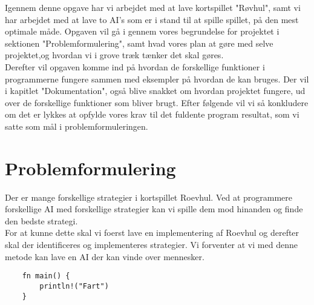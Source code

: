 \documentclass[a4paper, 12pt]{article}
\begin{document}
Igennem denne opgave har vi arbejdet med at lave kortspillet "Røvhul", samt vi har arbejdet med at lave to AI's som er i stand til at spille spillet, på den mest optimale måde. Opgaven vil gå i gennem vores begrundelse for projektet i sektionen "Problemformulering", samt hvad vores plan at gøre med selve projektet,og hvordan vi i grove træk tænker det skal gøres.
\\
Derefter vil opgaven komme ind på hvordan de forskellige funktioner i programmerne fungere sammen med eksempler på hvordan de kan bruges. Der vil i kapitlet "Dokumentation", også blive snakket om hvordan projektet fungere, ud over de forskellige funktioner som bliver brugt. Efter følgende vil vi så konkludere om det er lykkes at opfylde vores krav til det fuldente program resultat, som vi satte som mål i problemformuleringen.

\section{Problemformulering} \label{sec:Problemformulering}

Der er mange forskellige strategier i kortspillet Roevhul. Ved at programmere forskellige AI med forskellige strategier kan vi spille dem mod hinanden og finde den bedste strategi.
\\
For at kunne dette skal vi foerst lave en implementering af Roevhul og derefter skal der identificeres og implementeres strategier. Vi forventer at vi med denne metode kan lave en AI der kan vinde over mennesker.

\begin{verbatim}
	fn main() {
		println!("Fart")
	}
\end{verbatim}

\vfill
\pagebreak
\end{document}
